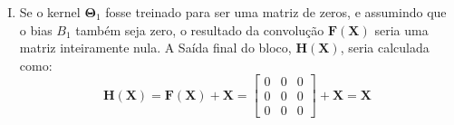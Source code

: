 \documentclass{dlproblemset}
\begin{document}
\begin{enumerate}[I)]
Portanto, a matriz $\mathbf{F}(\mathbf{X})$ é a negação da matriz de entrada $\mathbf{X}$:
$$
\mathbf{F}(\mathbf{X}) = \begin{bmatrix}
-1 & -2 & -3 \\
-4 & -5 & -6 \\
-7 & -8 & -9
\end{bmatrix}
$$

Cálculo $\mathbf{H}(\mathbf{X})$:
A saída final do bloco residual é a soma do resultado $\mathbf{F}(\mathbf{X})$ com a entrada original $\mathbf{X}$.
$$
\mathbf{H}(\mathbf{X}) = \mathbf{F}(\mathbf{X}) + \mathbf{X}
$$
$$
\mathbf{H}(\mathbf{X}) = \begin{bmatrix}
-1 & -2 & -3 \\
-4 & -5 & -6 \\
-7 & -8 & -9
\end{bmatrix}
+
\begin{bmatrix}
1 & 2 & 3 \\
4 & 5 & 6 \\
7 & 8 & 9
\end{bmatrix}
$$
\vspace{0.5cm}
$$
\mathbf{H}(\mathbf{X}) = \begin{bmatrix}
(-1+1) & (-2+2) & (-3+3) \\
(-4+4) & (-5+5) & (-6+6) \\
(-7+7) & (-8+8) & (-9+9)
\end{bmatrix}
=
\begin{bmatrix}
0 & 0 & 0 \\
0 & 0 & 0 \\
0 & 0 & 0
\end{bmatrix}
$$

Resultado Final:
A saída do bloco residual é uma matriz nula:
$$
\mathbf{H}(\mathbf{X}) = \begin{bmatrix}
0 & 0 & 0 \\
0 & 0 & 0 \\
0 & 0 & 0
\end{bmatrix}
$$
    \item Se o kernel $\mathbf{\Theta}_1$ fosse treinado para ser uma matriz de zeros, e assumindo que o bias $B_1$ também seja zero, o resultado da convolução $\mathbf{F}(\mathbf{X})$ seria uma matriz inteiramente nula. A Saída final do bloco, $\mathbf{H}(\mathbf{X})$, seria calculada como:
    $$ \mathbf{H}(\mathbf{X}) = \mathbf{F}(\mathbf{X}) + \mathbf{X} = \begin{bmatrix} 0 & 0 & 0 \\ 0 & 0 & 0 \\ 0 & 0 & 0 \end{bmatrix} + \mathbf{X} = \mathbf{X}$$


\end{enumerate}
\end{document}
